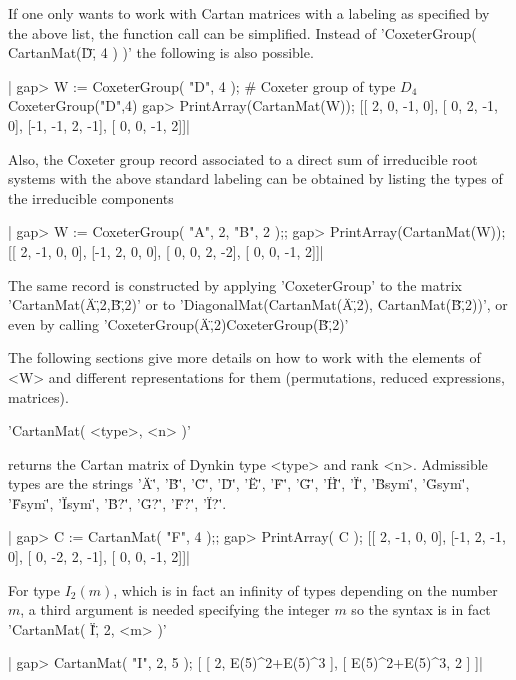 If one only wants to work with Cartan matrices with a labeling as specified
by  the  above  list,  the  function  call  can  be  simplified. Instead of
'CoxeterGroup( CartanMat(\"D\", 4 ) )' the following is also possible.

|    gap> W := CoxeterGroup( "D", 4 );       # Coxeter group of type $D_4$
    CoxeterGroup("D",4)
    gap> PrintArray(CartanMat(W));
    [[ 2,  0, -1,  0],
     [ 0,  2, -1,  0],
     [-1, -1,  2, -1],
     [ 0,  0, -1,  2]]|

Also,  the Coxeter group  record associated to  a direct sum of irreducible
root  systems with the  above standard labeling  can be obtained by listing
the types of the irreducible components\:

|    gap> W := CoxeterGroup( "A", 2, "B", 2 );;
    gap> PrintArray(CartanMat(W));
    [[ 2, -1,  0,  0],
     [-1,  2,  0,  0],
     [ 0,  0,  2, -2],
     [ 0,  0, -1,  2]]|

The  same record  is constructed  by applying  'CoxeterGroup' to the matrix
'CartanMat(\"A\",2,\"B\",2)'    or    to   'DiagonalMat(CartanMat(\"A\",2),
CartanMat(\"B\",2))', or even by calling
'CoxeterGroup(\"A\",2)\*CoxeterGroup(\"B\",2)'

The  following sections give more details on  how to work with the elements
of  <W>  and  different  representations  for  them  (permutations, reduced
expressions, matrices).

%

'CartanMat( <type>, <n> )'

returns the Cartan matrix of Dynkin type <type> and rank <n>. Admissible
types  are  the strings  '\"A\"',  '\"B\"',  '\"C\"', '\"D\"',  '\"E\"',
'\"F\"', '\"G\"', '\"H\"',  '\"I\"', '\"Bsym\"', '\"Gsym\"', '\"Fsym\"',
'\"Isym\"', '\"B?\"', '\"G?\"', '\"F?\"', '\"I?\"'.

|    gap> C := CartanMat( "F", 4 );;
    gap> PrintArray( C );
    [[ 2, -1,  0,  0],
     [-1,  2, -1,  0],
     [ 0, -2,  2, -1],
     [ 0,  0, -1,  2]]|

For type  $I_2(m)$, which is in  fact an infinity of  types depending on
the number $m$, a third argument is needed specifying the integer $m$ so
the syntax is in fact 'CartanMat( \"I\", 2, <m> )'\:

|    gap> CartanMat( "I", 2, 5 );
    [ [ 2, E(5)^2+E(5)^3 ], [ E(5)^2+E(5)^3, 2 ] ]|

